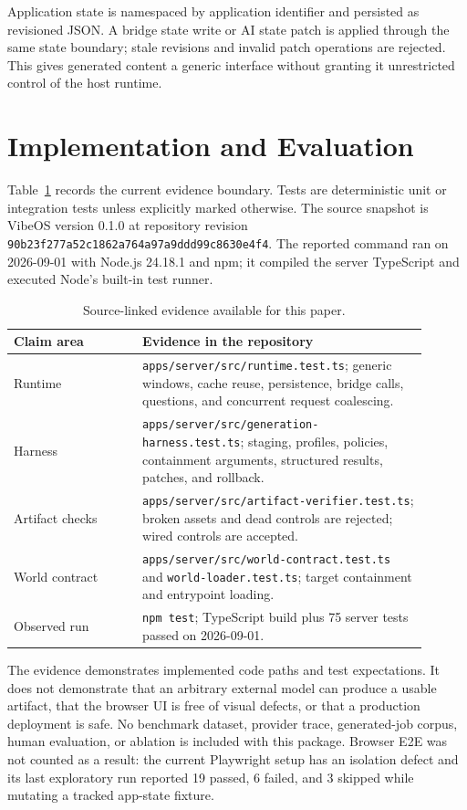 \documentclass[11pt]{article}
\begin{document}
Application state is namespaced by application identifier and persisted as revisioned JSON. A bridge state write or AI state patch is applied through the same state boundary; stale revisions and invalid patch operations are rejected. This gives generated content a generic interface without granting it unrestricted control of the host runtime.

\section{Implementation and Evaluation}
Table~\ref{tab:evidence} records the current evidence boundary. Tests are deterministic unit or integration tests unless explicitly marked otherwise. The source snapshot is VibeOS version 0.1.0 at repository revision \texttt{90b23f277a52c1862a764a97a9ddd99c8630e4f4}. The reported command ran on 2026-09-01 with Node.js 24.18.1 and npm; it compiled the server TypeScript and executed Node's built-in test runner.

\begin{table}[h]
\centering
\small
\caption{Source-linked evidence available for this paper.}
\label{tab:evidence}
\begin{tabular}{p{0.28\linewidth}p{0.62\linewidth}}
\toprule
Claim area & Evidence in the repository \\
\midrule
Runtime & \texttt{apps/server/src/runtime.test.ts}; generic windows, cache reuse, persistence, bridge calls, questions, and concurrent request coalescing. \\
Harness & \texttt{apps/server/src/generation-harness.test.ts}; staging, profiles, policies, containment arguments, structured results, patches, and rollback. \\
Artifact checks & \texttt{apps/server/src/artifact-verifier.test.ts}; broken assets and dead controls are rejected; wired controls are accepted. \\
World contract & \texttt{apps/server/src/world-contract.test.ts} and \texttt{world-loader.test.ts}; target containment and entrypoint loading. \\
Observed run & \texttt{npm test}; TypeScript build plus 75 server tests passed on 2026-09-01. \\
\bottomrule
\end{tabular}
\end{table}

The evidence demonstrates implemented code paths and test expectations. It does not demonstrate that an arbitrary external model can produce a usable artifact, that the browser UI is free of visual defects, or that a production deployment is safe. No benchmark dataset, provider trace, generated-job corpus, human evaluation, or ablation is included with this package. Browser E2E was not counted as a result: the current Playwright setup has an isolation defect and its last exploratory run reported 19 passed, 6 failed, and 3 skipped while mutating a tracked app-state fixture.
\end{document}
